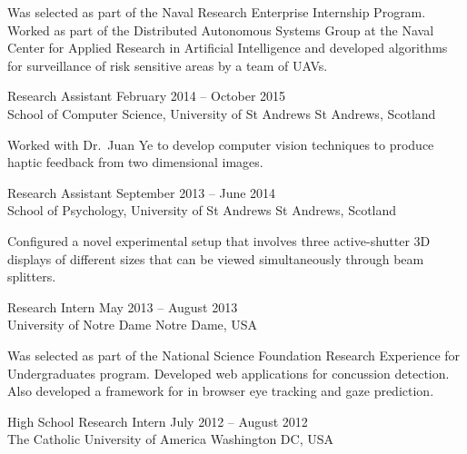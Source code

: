 \documentclass[line,margin]{cv}
\begin{document}
\begin{resume}
\begin{adjustwidth}{2.5em}{2.5em}
    Was selected as part of the Naval Research Enterprise Internship Program.
    Worked as part of the Distributed Autonomous Systems Group at the Naval
    Center for Applied Research in Artificial Intelligence and developed
    algorithms for surveillance of risk sensitive areas by a team of UAVs.

\end{adjustwidth}

Research Assistant
\hfill February 2014 -- October 2015 \\
School of Computer Science, University of St Andrews \hfill St Andrews,
Scotland

\begin{adjustwidth}{2.5em}{2.5em}

    Worked with Dr.\ Juan Ye to develop computer vision techniques to produce
    haptic feedback from two dimensional images.

\end{adjustwidth}

Research Assistant
\hfill September 2013 -- June 2014 \\
School of Psychology, University of St Andrews \hfill St Andrews, Scotland

\begin{adjustwidth}{2.5em}{2.5em}

    Configured a novel experimental setup that involves three active-shutter 3D
    displays of different sizes that can be viewed simultaneously through beam
    splitters.

\end{adjustwidth}

Research Intern
\hfill May 2013 -- August 2013 \\
University of Notre Dame \hfill Notre Dame, USA

\begin{adjustwidth}{2.5em}{2.5em}

    Was selected as part of the National Science Foundation Research Experience
    for Undergraduates program. Developed web applications for concussion
    detection. Also developed a framework for in browser eye tracking and gaze
    prediction.

\end{adjustwidth}

High School Research Intern
\hfill July 2012 -- August 2012 \\
The Catholic University of America \hfill Washington DC, USA

\begin{adjustwidth}{2.5em}{2.5em}


\end{adjustwidth}
\end{resume}
\end{document}
